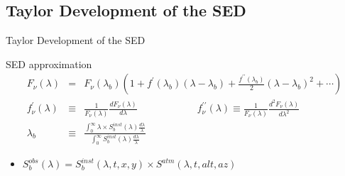 \documentclass{beamer}
\begin{document}
\subsection{Taylor Development of the SED}
\begin{frame}{Taylor Development of the SED} 
\begin{exampleblock}{SED approximation}
\begin{eqnarray}
F_\nu(\lambda) & = & F_\nu(\lambda_b) \left(1 + f^\prime(\lambda_b)(\lambda-\lambda_b) + \frac{f^{\prime\prime}(\lambda_b)}{2}(\lambda-\lambda_b)^2 + \cdots \right) \\
f_\nu^\prime(\lambda) & \equiv & \frac{1}{F_\nu(\lambda)}\frac{dF_\nu(\lambda)}{d\lambda} \qquad \qquad \qquad
f_\nu^{\prime\prime}(\lambda)  \equiv  \frac{1}{F_\nu(\lambda)}\frac{d^2F_\nu(\lambda)}{d\lambda^2} \nonumber \\
\lambda_b & \equiv & \frac{\int_0^{\infty} \lambda \times S_b^{inst}(\lambda) \frac{d\lambda}{\lambda}}
{\int_0^{\infty} S_b^{inst}(\lambda) \frac{d\lambda}{\lambda}}
\end{eqnarray}
\begin{itemize}
\item $S_b^{obs}(\lambda) = S_b^{inst}(\lambda,t,x,y) \times S^{atm}(\lambda,t,alt,az)$
\end{itemize}
\end{exampleblock}
\end{frame}
\end{document}
